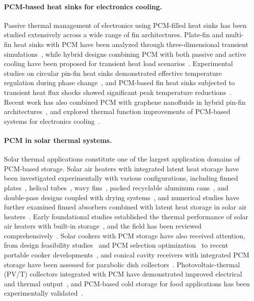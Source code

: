 \paragraph{PCM-based heat sinks for electronics cooling.}
Passive thermal management of electronics using PCM-filled heat sinks has been studied extensively across a wide range of fin architectures. Plate-fin and multi-fin heat sinks with PCM have been analyzed through three-dimensional transient simulations~\cite{wang2011three}, while hybrid designs combining PCM with both passive and active cooling have been proposed for transient heat load scenarios~\cite{borkar2022transient,marri2023multiple,sevik2025thermal,midhun2025solid}. Experimental studies on circular pin-fin heat sinks demonstrated effective temperature regulation during phase change~\cite{isiam2023experimental,rangarajan2019experimental}, and PCM-based fin heat sinks subjected to transient heat flux shocks showed significant peak temperature reductions~\cite{zhang2025experimental}. Recent work has also combined PCM with graphene nanofluids in hybrid pin-fin architectures~\cite{srevathsan2026experimental}, and explored thermal function improvements of PCM-based systems for electronics cooling~\cite{peng2021thermal}.

\paragraph{PCM in solar thermal systems.}
Solar thermal applications constitute one of the largest application domains of PCM-based storage. Solar air heaters with integrated latent heat storage have been investigated experimentally with various configurations, including finned plates~\cite{kabeel2017improvement,balakrishnan2024experimental}, helical tubes~\cite{saxena2020thermal}, wavy fins~\cite{singh2020numerical}, packed recyclable aluminum cans~\cite{tuncer2023experimental}, and double-pass designs coupled with drying systems~\cite{embiale2023investigation}, and numerical studies have further examined finned absorbers combined with latent heat storage in solar air heaters~\cite{hap2025numerical}. Early foundational studies established the thermal performance of solar air heaters with built-in storage~\cite{fath1995thermal}, and the field has been reviewed comprehensively~\cite{sharmapitchumani2022solar,arkar2015optimization}. Solar cookers with PCM storage have also received attention, from design feasibility studies~\cite{kumar2022design,chauhan2022design} and PCM selection optimization~\cite{anilkumar2021optimum} to recent portable cooker developments~\cite{pinnarat2026development}, and conical cavity receivers with integrated PCM storage have been assessed for parabolic dish collectors~\cite{nandanwar2025performance}. Photovoltaic-thermal (PV/T) collectors integrated with PCM have demonstrated improved electrical and thermal output~\cite{awad2022performance,fakhraei2024experimental}, and PCM-based cold storage for food applications has been experimentally validated~\cite{chinnasamy2021experimental,mane2024experimental,esakkimuthu2013experimental,raj2020transient,famiglietti2021swc,touati2017thermal,shalaby2022experimental}.

